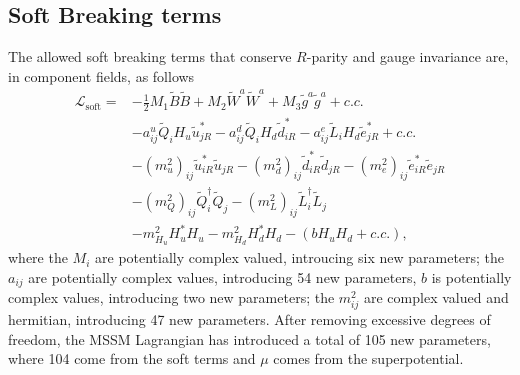 \documentclass[twoside,english]{uiofysmaster}
\begin{document}
\subsection{Soft Breaking terms}

The allowed soft breaking terms that conserve $R$-parity and gauge invariance are, in component fields, as follows
\begin{align}
\mathcal{L}_{\text{soft}} =& - \frac{1}{2} M_1 \tilde{B} \tilde{B} + M_2 \tilde{W}^a \tilde{W}^a + M_3 \tilde{g}^a \tilde{g}^a + c.c. \nonumber \\
&- a_{ij}^u \tilde{Q}_i H_u \tilde{u}_{jR}^* - a_{ij}^d \tilde{Q}_i H_d \tilde{d}_{iR}^* - a_{ij}^e \tilde{L}_i H_d \tilde{e}_{jR}^* + c.c. \nonumber \\
& -(m_u^2)_{ij} \tilde{u}_{iR}^* \tilde{u}_{jR} - (m_d^2)_{ij} \tilde{d}_{iR}^* \tilde{d}_{jR} - (m_e^2)_{ij} \tilde{e}_{iR}^* \tilde{e}_{jR} \nonumber \\
& - (m_Q^2)_{ij} \tilde{Q}_i^{\dagger} \tilde{Q}_j - (m_L^2)_{ij} \tilde{L}_i^{\dagger} \tilde{L}_j \nonumber \\
& - m_{H_u}^2 H_u^*H_u - m_{H_d}^2 H_d^* H_d - (b H_u H_d + c.c.),
\end{align}
where the $M_i$ are potentially complex valued, introucing six new parameters; the $a_{ij}$ are potentially complex values, introducing 54 new parameters, $b$ is potentially complex values, introducing two new parameters; the $m_{ij}^2$ are complex valued and hermitian, introducing 47 new parameters. After removing excessive degrees of freedom, the MSSM Lagrangian has introduced a total of 105 new parameters, where 104 come from the soft terms and $\mu$ comes from the superpotential.

%
\end{document}
